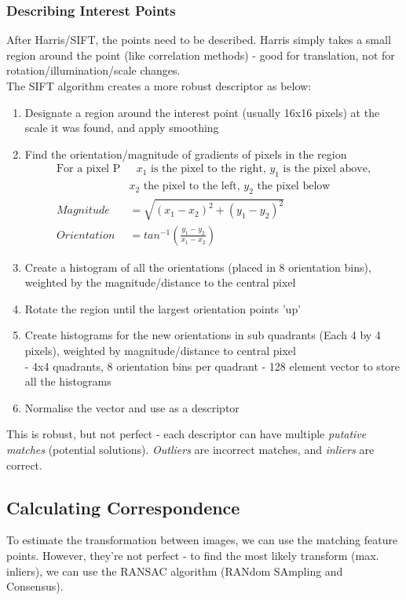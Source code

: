 \subsubsection{Describing Interest Points}
After Harris/SIFT, the points need to be described. Harris simply takes a small region around the point (like correlation methods) - good for translation, not for rotation/illumination/scale changes.\\
The SIFT algorithm creates a more robust descriptor as below:
\begin{enumerate}
    \item Designate a region around the interest point (usually 16x16 pixels) at the scale it was found, and apply smoothing 
    \item Find the orientation/magnitude of gradients of pixels in the region
    \begin{align*}
        \text{For a pixel P}&\text{ $x_1$ is the pixel to the right, $y_1$ is the pixel above,}\\
        &\text{$x_2$ the pixel to the left, $y_2$ the pixel below} \\
        Magnitude &= \sqrt{(x_1 - x_2)^2 + (y_1 - y_2)^2} \\
        Orientation &= tan^{-1}\left(\frac{y_1-y_2}{x_1-x_2}\right)
    \end{align*}
    \item Create a histogram of all the orientations (placed in 8 orientation bins), weighted by the magnitude/distance to the central pixel
    \item Rotate the region until the largest orientation points 'up'
    \item Create histograms for the new orientations in sub quadrants (Each 4 by 4 pixels), weighted by magnitude/distance to central pixel \\ \quad\quad - 4x4 quadrants, 8 orientation bins per quadrant - 128 element vector to store all the histograms
    \item Normalise the vector and use as a descriptor
\end{enumerate}
This is robust, but not perfect - each descriptor can have multiple \emph{putative matches} (potential solutions). \emph{Outliers} are incorrect matches, and \emph{inliers} are correct.

\subsection{Calculating Correspondence}
To estimate the transformation between images, we can use the matching feature points. However, they're not perfect - to find the most likely transform (max. inliers), we can use the RANSAC algorithm (RANdom SAmpling and Consensus). 

